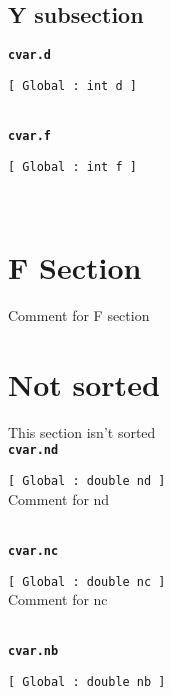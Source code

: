 \subsection{Y subsection}{\tt \bf cvar.d }
\\
\makebox[0.5in]{}\begin{minipage}[t]{6in}
{\tt [ Global : int  d ]  }\\

\end{minipage}\\

{\tt \bf cvar.f }
\\
\makebox[0.5in]{}\begin{minipage}[t]{6in}
{\tt [ Global : int  f ]  }\\

\end{minipage}\\

\section{F Section}   Comment for F section   
\\\section{Not sorted}   This section isn't sorted   
\\{\tt \bf cvar.nd }
\\
\makebox[0.5in]{}\begin{minipage}[t]{6in}
{\tt [ Global : double  nd ]  }\\
   Comment for nd   
\\

\end{minipage}\\

{\tt \bf cvar.nc }
\\
\makebox[0.5in]{}\begin{minipage}[t]{6in}
{\tt [ Global : double  nc ]  }\\
   Comment for nc   
\\

\end{minipage}\\

{\tt \bf cvar.nb }
\\
\makebox[0.5in]{}\begin{minipage}[t]{6in}
{\tt [ Global : double  nb ]  }\\

\end{minipage}\\

